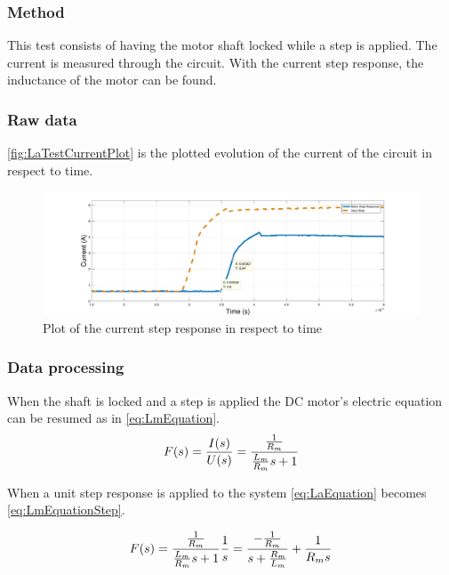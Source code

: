 \subsubsection*{Method}
This test consists of having the motor shaft locked while a step is applied. The current is measured through the circuit. With the current step response, the inductance of the motor can be found. 
\subsubsection*{Raw data}
\autoref{fig:LaTestCurrentPlot} is the plotted evolution of the current of the circuit in respect to time.

\begin{figure}[htbp]
	\centering
	\includegraphics[width=1.2\textwidth]{figures/appendix/Motor&GearTests/PlotLm}
	\caption{Plot of the current step response in respect to time}\label{fig:LaTestCurrentPlot}
\end{figure}

\subsubsection*{Data processing}
When the shaft is locked and a step is applied the DC motor's electric equation can be resumed as in \autoref{eq:LmEquation}.
\begin{equation}
	F(s)=\frac{I(s)}{U(s)}=\frac{\frac{1}{R_m}}{\frac{L_m}{R_m} s+1} \addunit{1}
	\label{eq:LmEquation}
\end{equation}
\startexplain
{}
\stopexplain

When a unit step response is applied to the system \autoref{eq:LaEquation} becomes \autoref{eq:LmEquationStep}.

\begin{equation}
F(s)=\frac{\frac{1}{R_m}}{\frac{L_m}{R_m} s+1}\frac{1}{s}=\frac{-\frac{1}{R_m}}{s+\frac{R_m}{L_m}}+\frac{1}{R_m s} \addunit{1}
\label{eq:LmEquationStep}
\end{equation}

